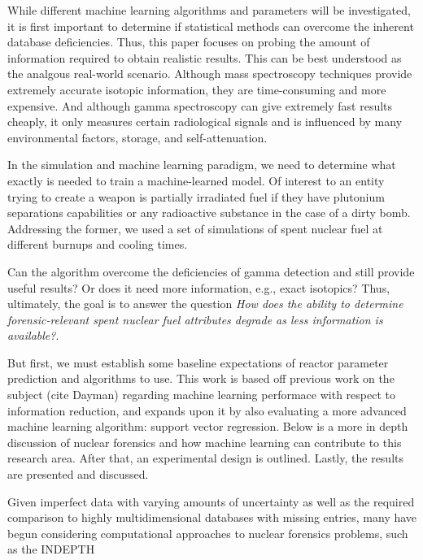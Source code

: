 While different machine learning algorithms and parameters will be
investigated, it is first important to determine if statistical methods can
overcome the inherent database deficiencies. Thus, this paper focuses on
probing the amount of information required to obtain realistic results.  This
can be best understood as the analgous real-world scenario. Although mass
spectroscopy techniques provide extremely accurate isotopic information, they
are time-consuming and more expensive. And although gamma spectroscopy can give
extremely fast results cheaply, it only measures certain radiological signals
and is influenced by many environmental factors, storage, and self-attenuation.

 In the simulation and machine
learning paradigm, we need to determine what exactly is needed to train a
machine-learned model. Of interest to an entity trying to create a weapon is
partially irradiated fuel if they have plutonium separations capabilities or
any radioactive substance in the case of a dirty bomb. Addressing the former,
we used a set of simulations of spent nuclear fuel at different burnups and
cooling times. 

Can the algorithm overcome the deficiencies of gamma detection and still
provide useful results? Or does it need more information, e.g., exact
isotopics? Thus, ultimately, the goal is to answer the question \textit{How
does the ability to determine forensic-relevant spent nuclear fuel attributes
degrade as less information is available?}. 

But first, we must establish some baseline expectations of reactor parameter
prediction and algorithms to use.  This work is based off previous work on the
subject (cite Dayman) regarding machine learning performace with respect to
information reduction, and expands upon it by also evaluating a more advanced
machine learning algorithm: support vector regression. Below is a more in depth
discussion of nuclear forensics and how machine learning can contribute to this
research area. After that, an experimental design is outlined. Lastly, the
results are presented and discussed. 



Given imperfect data with varying amounts of uncertainty as well as the
required comparison to highly multidimensional databases with missing entries,
many have begun considering computational approaches to nuclear forensics
problems, such as the INDEPTH

